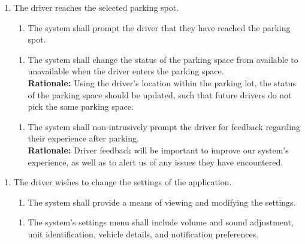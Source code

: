 \documentclass[12pt,letterpaper]{article}
\newcounter{businesseventnum}
\newcounter{funcreqnum}
\begin{document}
\begin{enumerate}[{BE}\thebusinesseventnum.] 
\item The driver reaches the selected parking spot.
\begin{enumerate}[{FR}\thefuncreqnum.] 
    \item The system shall prompt the driver that they have reached the parking spot. \label{poc4}
\end{enumerate}

\begin{enumerate}[{FR}\thefuncreqnum.] 
    \item The system shall change the status of the parking space from available to unavailable when the driver enters the parking space. \label{poc5}\\
    \textbf{Rationale:} Using the driver's location within the parking lot, the status of the parking space should be updated, such that future drivers do not pick the same parking space.
\end{enumerate}
\begin{enumerate}[{FR}\thefuncreqnum.] 
    \item The system shall non-intrusively prompt the driver for feedback regarding their experience after parking.\\
    \textbf{Rationale:} Driver feedback will be important to improve our system's experience, as well as to alert us of any issues they have encountered.
\end{enumerate}
\end{enumerate}

\begin{enumerate}[{BE}\thebusinesseventnum.] 
\item The driver wishes to change the settings of the application.
\begin{enumerate}[{FR}\thefuncreqnum.] 
    \item The system shall provide a means of viewing and modifying the settings.
\end{enumerate}

\begin{enumerate}[{FR}\thefuncreqnum.] 
    \item The system's settings menu shall include volume and sound adjustment, unit identification, vehicle details, and notification preferences.
\end{enumerate}
\end{enumerate}
\end{document}
